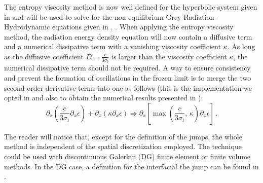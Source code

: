 \documentclass[times,doublespace]{fldauth}%
\begin{document}
The entropy viscosity method is now well defined for the hyperbolic system given in  and will be used to solve for the non-equilibrium Grey Radiation-Hydrodynamic equations given in . .
When applying the entropy viscosity method, the radiation energy density equation will now contain a diffusive term and a numerical dissipative term with a vanishing viscosity coefficient $\kappa$. As long as the diffusive coefficient $D=\frac{c}{3 \sigma_t}$ is larger than the viscosity coefficient $\kappa$, the numerical dissipative term should not be required. A way to ensure consistency and prevent the formation of oscillations in the frozen limit is to merge the two second-order derivative terms into one as follows (this is the implementation we opted in \cite{our_jcp_radhy_paper} and also to obtain the numerical results presented in ):
%
\begin{equation}
 \partial_x \left( \frac{c}{3 \sigma_t} \partial_x \epsilon \right) + \partial_x \left( \kappa \partial_x \epsilon \right) 
 \Longrightarrow
 \partial_x \left[ \max\left(\frac{c}{3 \sigma_t} \text{, } \kappa \right) \partial_x \epsilon \right] \,.
\end{equation}
%
%
 \begin{remark}
The reader will notice that, except for the definition of the jumps, the whole method is independent of the spatial discretization employed. The technique could be used with discontinuous Galerkin (DG) finite element or finite volume methods. In the DG case, a definition for the interfacial the jump can be found in \cite{valentin}.
 \end{remark}
%
\end{document}
